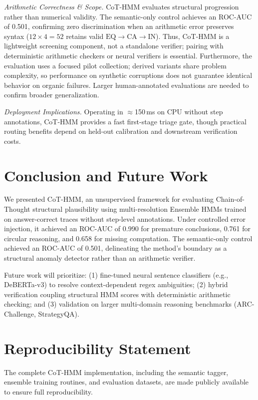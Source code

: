 \documentclass[conference]{IEEEtran}
\begin{document}
\textit{Arithmetic Correctness \& Scope.} CoT-HMM evaluates structural progression rather than numerical validity. The semantic-only control achieves an ROC-AUC of 0.501, confirming zero discrimination when an arithmetic error preserves syntax ($12 \times 4 = 52$ retains valid $\text{EQ} \to \text{CA} \to \text{IN}$). Thus, CoT-HMM is a lightweight screening component, not a standalone verifier; pairing with deterministic arithmetic checkers or neural verifiers is essential. Furthermore, the evaluation uses a focused pilot collection; derived variants share problem complexity, so performance on synthetic corruptions does not guarantee identical behavior on organic failures. Larger human-annotated evaluations are needed to confirm broader generalization.

\textit{Deployment Implications.} Operating in $\approx$150\,ms on CPU without step annotations, CoT-HMM provides a fast first-stage triage gate, though practical routing benefits depend on held-out calibration and downstream verification costs.

\section{Conclusion and Future Work}

We presented CoT-HMM, an unsupervised framework for evaluating Chain-of-Thought structural plausibility using multi-resolution Ensemble HMMs trained on answer-correct traces without step-level annotations. Under controlled error injection, it achieved an ROC-AUC of 0.990 for premature conclusions, 0.761 for circular reasoning, and 0.658 for missing computation. The semantic-only control achieved an ROC-AUC of 0.501, delineating the method's boundary as a structural anomaly detector rather than an arithmetic verifier.

Future work will prioritize: (1) fine-tuned neural sentence classifiers (e.g., DeBERTa-v3) to resolve context-dependent regex ambiguities; (2) hybrid verification coupling structural HMM scores with deterministic arithmetic checking; and (3) validation on larger multi-domain reasoning benchmarks (ARC-Challenge, StrategyQA).

\section*{Reproducibility Statement}
The complete CoT-HMM implementation, including the semantic tagger, ensemble training routines, and evaluation datasets, are made publicly available to ensure full reproducibility.
\end{document}
